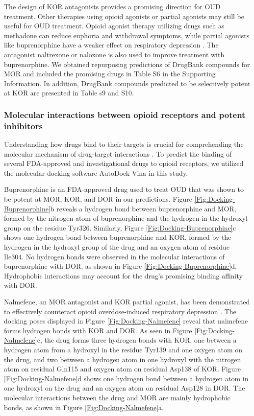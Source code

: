 \documentclass[10pt]{article}
\begin{document}
		The design of KOR antagonists provides a promising direction for OUD treatment. Other therapies using opioid agonists or partial agonists may still be useful for OUD treatment. Opioid agonist therapy utilizing drugs such as methadone can reduce euphoria and withdrawal symptoms, while partial agonists like buprenorphine have a weaker effect on respiratory depression \cite{wang2019historical}. The antagonist naltrexone or naloxone is also used to improve treatment with buprenorphine. We obtained repurposing predictions of DrugBank compounds for MOR and included the promising drugs in Table S6 in the Supporting Information. In addition, DrugBank compounds predicted to be selectively potent at KOR are presented in Table s9 and S10.
		
		
		\subsubsection{Molecular interactions between opioid receptors and potent inhibitors}
		
		
		Understanding how drugs bind to their targets is crucial for comprehending the molecular mechanism of drug-target interactions \cite{vo2021mu}. To predict the binding of several FDA-approved and investigational drugs to opioid receptors, we utilized the molecular docking software AutoDock Vina \cite{trott2010autodock} in this study.
		
		Buprenorphine is an FDA-approved drug used to treat OUD that was shown to be potent at MOR, KOR, and DOR in our predictions. Figure \ref{Fig:Docking-Buprenorphine}b reveals a hydrogen bond between buprenorphine and MOR, formed by the nitrogen atom of buprenorphine and the hydrogen in the hydroxyl group on the residue Tyr326. Similarly, Figure \ref{Fig:Docking-Buprenorphine}c shows one hydrogen bond between buprenorphine and KOR, formed by the hydrogen in the hydroxyl group of the drug and an oxygen atom of residue Ile304. No hydrogen bonds were observed in the molecular interactions of buprenorphine with DOR, as shown in Figure \ref{Fig:Docking-Buprenorphine}d. Hydrophobic interactions may account for the drug's promising binding affinity with DOR.
		
		Nalmefene, an MOR antagonist and KOR partial agonist, has been demonstrated to effectively counteract opioid overdose-induced respiratory depression \cite{park2019prevention}. The docking poses displayed in Figure \ref{Fig:Docking-Nalmefene} reveal that nalmefene forms hydrogen bonds with KOR and DOR. As seen in Figure \ref{Fig:Docking-Nalmefene}c, the drug forms three hydrogen bonds with KOR, one between a hydrogen atom from a hydroxyl in the residue Tyr139 and one oxygen atom on the drug, and two between a hydrogen atom in one hydroxyl with the nitrogen atom on residual Gln115 and oxygen atom on residual Asp138 of KOR. Figure \ref{Fig:Docking-Nalmefene}d shows one hydrogen bond between a hydrogen atom in one hydroxyl on the drug and an oxygen atom on residual Asp128 in DOR. The molecular interactions between the drug and MOR are mainly hydrophobic bonds, as shown in Figure \ref{Fig:Docking-Nalmefene}a.
		
\end{document}
